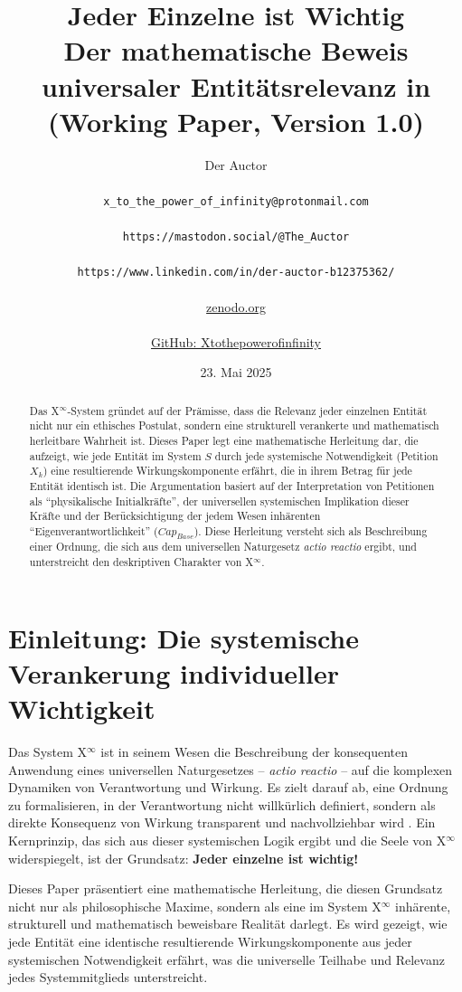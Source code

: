 \documentclass[12pt]{scrartcl}
\title{Jeder Einzelne ist Wichtig\\
Der mathematische Beweis universaler Entitätsrelevanz in \protect{X$^\infty$} \\(Working Paper, Version 1.0)}
\author{Der Auctor \\\\ 
\texttt{x\_to\_the\_power\_of\_infinity@protonmail.com} \\\\
\texttt{https://mastodon.social/@The\_Auctor} \\\\
\texttt{https://www.linkedin.com/in/der-auctor-b12375362/} \\\\
\href{https://zenodo.org/communities/xtothepowerofinfinity/}{zenodo.org} \\\\
\href{https://github.com/Xtothepowerofinfinity/Philosophie_der_Verantwortung}{GitHub: Xtothepowerofinfinity}}
\date{23. Mai 2025}
\begin{document}
\maketitle
\begin{abstract}
Das X$^\infty$-System gründet auf der Prämisse, dass die Relevanz jeder einzelnen Entität nicht nur ein ethisches Postulat, sondern eine strukturell verankerte und mathematisch herleitbare Wahrheit ist. Dieses Paper legt eine mathematische Herleitung dar, die aufzeigt, wie jede Entität im System $S$ durch jede systemische Notwendigkeit (Petition $X_k$) eine resultierende Wirkungskomponente erfährt, die in ihrem Betrag für jede Entität identisch ist. Die Argumentation basiert auf der Interpretation von Petitionen als \enquote{physikalische Initialkräfte}, der universellen systemischen Implikation dieser Kräfte und der Berücksichtigung der jedem Wesen inhärenten \enquote{Eigenverantwortlichkeit} ($Cap_{Base}$). Diese Herleitung versteht sich als Beschreibung einer Ordnung, die sich aus dem universellen Naturgesetz \textit{actio reactio} ergibt, und unterstreicht den deskriptiven Charakter von X$^\infty$.
\end{abstract}
\thispagestyle{empty}
\clearpage
{}

\tableofcontents
\clearpage

\section{Einleitung: Die systemische Verankerung individueller Wichtigkeit}
Das System X$^\infty$ ist in seinem Wesen die Beschreibung der konsequenten Anwendung eines universellen Naturgesetzes – \textit{actio reactio} \cite{Auctor:Zenodo15385150} – auf die komplexen Dynamiken von Verantwortung und Wirkung. Es zielt darauf ab, eine Ordnung zu formalisieren, in der Verantwortung nicht willkürlich definiert, sondern als direkte Konsequenz von Wirkung transparent und nachvollziehbar wird \cite{Auctor:Zenodo15385150}. Ein Kernprinzip, das sich aus dieser systemischen Logik ergibt und die Seele von X$^\infty$ widerspiegelt, ist der Grundsatz: \textbf{Jeder einzelne ist wichtig!}

Dieses Paper präsentiert eine mathematische Herleitung, die diesen Grundsatz nicht nur als philosophische Maxime, sondern als eine im System X$^\infty$ inhärente, strukturell und mathematisch beweisbare Realität darlegt. Es wird gezeigt, wie jede Entität eine identische resultierende Wirkungskomponente aus jeder systemischen Notwendigkeit erfährt, was die universelle Teilhabe und Relevanz jedes Systemmitglieds unterstreicht.
\end{document}
